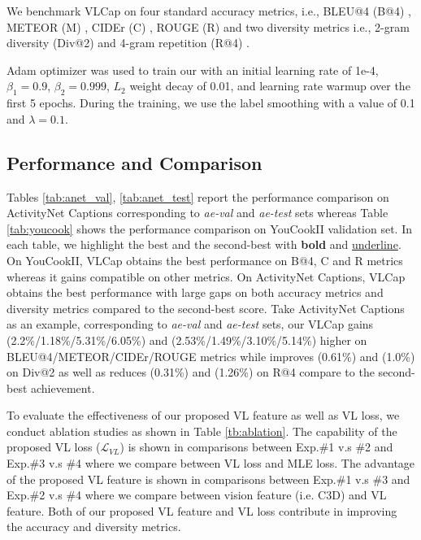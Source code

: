 \documentclass{article}
\begin{document}
We benchmark VLCap on four standard accuracy metrics, i.e., BLEU@4 (B@4) \cite{papineni2002bleu}, METEOR (M) \cite{denkowski2014meteor}, CIDEr (C) \cite{vedantam2015cider}, ROUGE (R) \cite{lin2004rouge} and two diversity metrics i.e., 2-gram diversity (Div@2) \cite{div} and 4-gram repetition (R@4) \cite{xiong2018move}. 

Adam optimizer was used to train our \model with an initial learning rate of 1e-4, $\beta_1=0.9$, $\beta_2=0.999$, $L_2$ weight decay of 0.01, and learning rate warmup over the first 5 epochs. During the training, we use the label smoothing with a value of 0.1 and $\lambda=0.1$. 
\vspace{-4mm}

\subsection{Performance and Comparison}
\vspace{-2mm}

Tables \ref{tab:anet_val}, \ref{tab:anet_test} report the performance comparison on ActivityNet Captions corresponding to \textit{ae-val} and \textit{ae-test} sets whereas Table \ref{tab:youcook} shows the performance comparison on YouCookII validation set. In each table, we highlight the best and the second-best with \textbf{bold} and \underline{underline}. On YouCookII, VLCap obtains the best performance on B@4, C and R metrics whereas it gains compatible on other metrics. On ActivityNet Captions, VLCap obtains the best performance with large gaps on both accuracy metrics and diversity metrics compared to the second-best score. Take ActivityNet Captions as an example, corresponding to \textit{ae-val} and \textit{ae-test} sets, our VLCap gains (2.2\%/1.18\%/5.31\%/6.05\%) and (2.53\%/1.49\%/3.10\%/5.14\%) higher on BLEU@4/METEOR/CIDEr/ROUGE metrics while improves (0.61\%) and (1.0\%) on Div@2 as well as reduces (0.31\%) and (1.26\%) on R@4 compare to the second-best achievement.  

To evaluate the effectiveness of our proposed VL feature as well as VL loss, we conduct ablation studies as shown in Table \ref{tb:ablation}. The capability of the proposed VL loss ($\mathcal{L}_{VL}$) is shown in comparisons between Exp.\#1 v.s \#2 and  Exp.\#3 v.s \#4 where we compare between VL loss and MLE loss. The advantage of the proposed VL feature is shown in comparisons between Exp.\#1 v.s \#3 and Exp.\#2 v.s \#4 where we compare between vision feature (i.e. C3D) and VL feature. Both of our proposed VL feature and VL loss contribute in improving the accuracy and diversity metrics.
\end{document}
